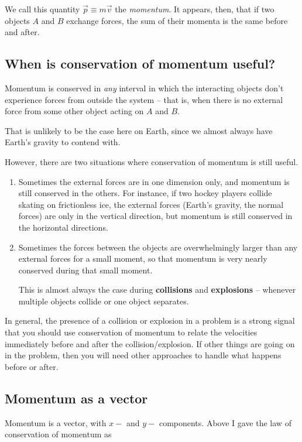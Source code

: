\documentclass[10pt]{article}
\begin{document}
We call this quantity $\vec p \equiv m\vec v$ the {\it momentum}. It appears, then, that if two objects $A$ and $B$ exchange forces, the sum of their momenta is the same before and after.

\subsection{When is conservation of momentum useful?}

Momentum is conserved in {\it any} interval in which the interacting objects don't experience forces from outside the system -- that is, when there is no external force from some other object acting on $A$ and $B$. 

That is unlikely to be the case here on Earth, since we almost always have Earth's gravity to contend with.

However, there are two situations where conservation of momentum is still useful.

\begin{enumerate}
	\item Sometimes the external forces are in one dimension only, and momentum is still conserved in the others. For instance, if two hockey players collide skating on frictionless ice, the external forces (Earth's gravity, the normal forces) are only in the vertical direction, but momentum is still conserved in the horizontal directions. 
	\item Sometimes the forces between the objects are overwhelmingly larger than any external forces for a small moment, so that momentum is very nearly conserved during that small moment.
	
	This is almost always the case during {\bf collisions} and {\bf explosions} -- whenever multiple objects collide or one object separates.
\end{enumerate}

In general, the presence of a collision or explosion in a problem is a strong signal that you should use conservation of momentum to relate the velocities immediately before and after the collision/explosion. If other things are going on in the problem, then you will need other approaches to handle what happens before or after.

\subsection{Momentum as a vector}

Momentum is a vector, with $x-$ and $y-$ components. Above I gave the law of conservation of momentum as 
\end{document}
